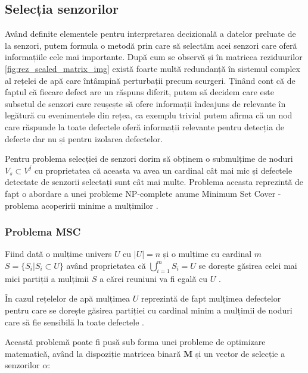 \subsection{Selecția senzorilor}

Având definite elementele pentru interpretarea decizională a datelor preluate de la senzori, putem formula o metodă prin care să selectăm acei senzori care oferă informațiile cele mai importante. După cum se observă și în matricea reziduurilor \ref{fig:rez_scaled_matrix_img} există foarte multă redundanță în sistemul complex al rețelei de apă care întâmpină perturbații precum scurgeri. Ținând cont că de faptul că fiecare defect are un răspuns diferit, putem să decidem care este subsetul de senzori care reușește să ofere informații îndeajuns de relevante în legătură cu evenimentele din rețea, ca exemplu trivial putem afirma că un nod care răspunde la toate defectele oferă informații relevante pentru detecția de defecte dar nu și pentru izolarea defectelor.

Pentru problema selecției de senzori dorim să obținem o submulțime de noduri $V_s \subset V^j$ cu proprietatea că aceasta va avea un cardinal cât mai mic și defectele detectate de senzorii selectați sunt cât mai multe. Problema aceasta reprezintă de fapt o abordare a unei probleme NP-complete anume Minimum Set Cover - problema acoperirii minime a mulțimilor \cite{perelman2016sensor}.

\subsubsection{Problema MSC} 
Fiind dată o mulțime univers $U$ cu $|U| = n$ și o mulțime cu cardinal $m$ $S = \{S_i | S_i \subset U\}$ având proprietatea că  $\bigcup\limits_{i=1}^{m} S_{i} = U$ se dorește găsirea celei mai mici partiții a mulțimii $S$ a cărei reuniuni va fi egală cu $U$ \cite{CLRS}. 

În cazul rețelelor de apă mulțimea $U$ reprezintă de fapt mulțimea defectelor pentru care se dorește găsirea partiției cu cardinal minim a mulțimii de noduri care să fie sensibilă la toate defectele \cite{perelman2016sensor}.

Această problemă poate fi pusă sub forma unei probleme de optimizare matematică, având la dispoziție matricea binară $\mathbf{M}$ și un vector de selecție a senzorilor $\alpha$:


